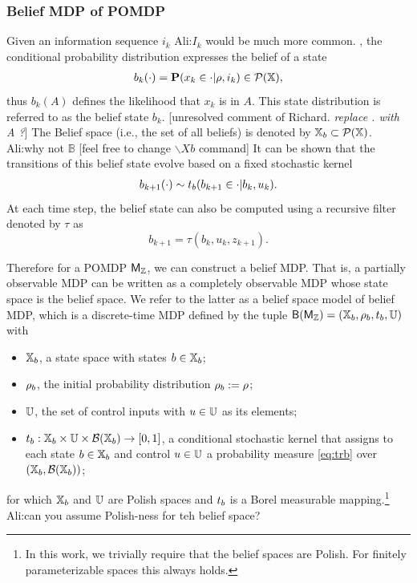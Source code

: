 \documentclass{ifacconf}
\newcommand{\red}[1]{{\color{red} #1}}
\renewcommand{\axx}[1]{{\color{orange} Ali:#1}}
\begin{document}
 \subsubsection{Belief MDP of POMDP}
 Given an information sequence $i_k$ \axx{$I_k$ would be much more common. },  the conditional probability distribution expresses the belief of a state 
\begin{align}
	b_k(\cdot)=\mathbf{P}(x_k\in \cdot|\rho,i_k)\in \mathcal P ({\mathbb{X}}),
\end{align}
thus $	b_k(A) $ defines the likelihood that $x_k$ is in $A$.  %
This state distribution is referred to as the belief state $b_k$.  \red{[unresolved comment of Richard. {\it replace . with A ?}]}
The Belief space (i.e., the set of all beliefs) is denoted by ${{\mathbb{X}}_b}\subset \mathcal P({\mathbb{X}})$. \axx{why not $\mathbb{B}$ \red{[feel free to change $\backslash Xb$ command]}}
It can be shown that the transitions of this belief state evolve based on a fixed stochastic kernel
\begin{align}\label{eq:trb}
	 b_{k+1}(\cdot)\sim t_b(b_{k+1}\in \cdot|b_k,u_k).
\end{align}
At each time step, the belief state can also be computed using a 
recursive filter denoted by $\tau$ as 
\[b_{k+1}=\tau(b_k,u_k,z_{k+1}).\]

Therefore for a POMDP $\mathsf{M}_{{\mathbb{Z}}}$, we can construct a belief MDP. 
 That is, a partially observable MDP can be written as a completely observable MDP whose state space is the belief space. We refer to the latter as a belief space model of belief MDP, which is a
discrete-time MDP defined by the tuple $\mathsf{B}(\mathsf{M}_{{\mathbb{Z}}}) = ({{\mathbb{X}}_b}, \rho_b, t_b, {\mathbb{U}})$ with
  \begin{itemize}
    \item ${{\mathbb{X}}_b}$,  a state space with states $b\in{{\mathbb{X}}_b}$; %
    \item $\rho_b$, the initial probability distribution $\rho_b:=\rho$;
    \item ${\mathbb{U}}$, the set of control inputs with $u\in{\mathbb{U}}$ as its elements;
    \item $t_b:{{\mathbb{X}}_b}\times{\mathbb{U}}\times\mathcal B({{\mathbb{X}}_b})\rightarrow[0,1]$, a conditional stochastic kernel that assigns to each state $b\in {{\mathbb{X}}_b}$ and control $u\in {\mathbb{U}}$ a probability measure \eqref{eq:trb} over $({{\mathbb{X}}_b},\mathcal B({{\mathbb{X}}_b}))$;
  \end{itemize}
  for which ${{\mathbb{X}}_b}$ and ${\mathbb{U}}$ are  Polish spaces \citep{bertsekas2004stochastic} and $t_b$ is a Borel measurable mapping.\footnote{In this work, we trivially require that the belief spaces are Polish. For finitely parameterizable spaces this always holds. } \axx{can you assume Polish-ness for teh belief space?}
\end{document}
